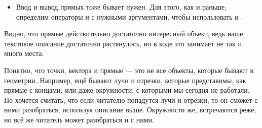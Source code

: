 \begin{itemize}
    Хочется разделять эти два случая, поэтому проверим различаются ли все коэффициенты в одинаковое количество раз (если да, то это уравнения одной прямой). Понятно, что это означает необходимость проверить три равенства:
    \[\begin{multisys}
        \begin{system}
            \frac{a_1}{a_2} = \frac{b_1}{b_2} \\
            \frac{b_1}{b_2} = \frac{c_1}{c_2} \\
            \frac{c_1}{c_2} = \frac{a_1}{a_2}
        \end{system}
        \iff
        \begin{system}
            a_1 b_2 = a_2 b_1 \\
            b_1 c_2 = b_2 c_1 \\
            a_2 c_1 = a_1 c_2
        \end{system}
        \iff
        \begin{system}
            a_1 b_2 - a_2 b_1 = 0 \\
            b_1 c_2 - b_2 c_1 = 0 \\
            a_2 c_1 - a_1 c_2 = 0
        \end{system}
    \end{multisys}\]
    Интересно, что первое из этих равенств мы уже проверили, а второе и третье выражения используются в формулах для координаты точки пересечения прямых.
    
    Таким образом, мы умеем разделять случаи взаимного расположения прямых и определять точку их пересечения, а в коде для пересечения удобно использовать оператор \lcpp{^}.
    
    \item Ввод и вывод прямых тоже бывает нужен. Для этого, как и раньше, определим операторы \lcpp{>>} и \lcpp{<<} с нужными аргументами. чтобы использовать  и .
\end{itemize}

Видно, что прямые действительно достаточно интересный объект, ведь наше текстовое описание достаточно растянулось, но в коде это занимает не так и много места:



Понятно, что точки, вектора и прямые — это не все объекты, которые бывают в геометрии. Например, ещё бывают лучи и отрезки, которые представимы, как прямые с концами, или даже окружности, с которыми мы сегодня не работали. Но хочется считать, что если читателю попадутся лучи и отрезки, то он сможет с ними разобраться, используя описание выше. Окружности же, встречаются реже, но всё же читатель может разобраться и с ними.

